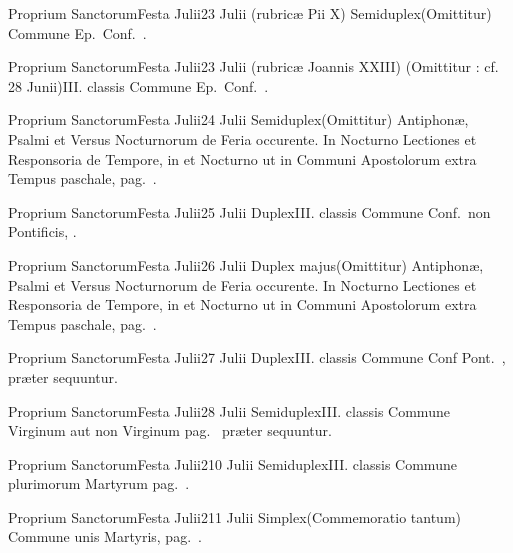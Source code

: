 \documentclass[nocturnale-romanum.tex]{subfiles}
\begin{document}
	{Proprium Sanctorum}{Festa Julii}{2}{3 Julii (rubricæ Pii X)}
	{Semiduplex}{(Omittitur)}
	{Commune Ep.\ Conf.\ \pageref{M-COPO}.}
	{}

	{Proprium Sanctorum}{Festa Julii}{2}{3 Julii (rubricæ Joannis XXIII)}
	{(Omittitur : cf. 28 Junii)}{III. classis}
	{}
	{Commune Ep.\ Conf.\ \pageref{M-COPO}.}

	{Proprium Sanctorum}{Festa Julii}{2}{4 Julii}
	{Semiduplex}{(Omittitur)}
	{Antiphonæ, Psalmi et Versus Nocturnorum de Feria occurente. In  Nocturno Lectiones et Responsoria de Tempore, in  et  Nocturno ut in Communi Apostolorum extra Tempus paschale, pag.\ \pageref{M-APEXN2R1}.}
	{}

	{Proprium Sanctorum}{Festa Julii}{2}{5 Julii}
	{Duplex}{III. classis}
	{Commune Conf.\ non Pontificis, \pageref{M-CONP}.}
	{}

	{Proprium Sanctorum}{Festa Julii}{2}{6 Julii}
	{Duplex majus}{(Omittitur)}
	{Antiphonæ, Psalmi et Versus Nocturnorum de Feria occurente. In  Nocturno Lectiones et Responsoria de Tempore, in  et  Nocturno ut in Communi Apostolorum extra Tempus paschale, pag.\ \pageref{M-APEXN2R1}.}
	{}

	{Proprium Sanctorum}{Festa Julii}{2}{7 Julii}
	{Duplex}{III. classis}
	{Commune Conf Pont.\ \pageref{M-COPO}, præter sequuntur.}
	{}

	{Proprium Sanctorum}{Festa Julii}{2}{8 Julii}
	{Semiduplex}{III. classis}
	{Commune Virginum aut non Virginum pag.\ \pageref{M-MU} præter sequuntur.}
	{}

	{Proprium Sanctorum}{Festa Julii}{2}{10 Julii}
	{Semiduplex}{III. classis}
	{Commune plurimorum Martyrum pag.\ \pageref{M-PMEX}.}
	{}

	{Proprium Sanctorum}{Festa Julii}{2}{11 Julii}
	{Simplex}{(Commemoratio tantum)}
	{Commune unis Martyris, pag.\ \pageref{M-UMEX}.}
	{}
\end{document}

